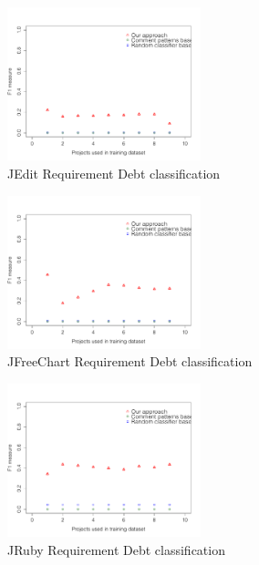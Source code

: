 \begin{figure}[thb!]
  \centering
  \includegraphics[width=0.50\textwidth]{figures/appendix/iteration_details/implementation_jedit.pdf}
  \vspace{-3mm}
  \caption{JEdit Requirement Debt classification}
  \label{fig:implementation_jedit}
\end{figure}

\begin{figure}[thb!]
  \centering
  \includegraphics[width=0.50\textwidth]{figures/appendix/iteration_details/implementation_jfreechart.pdf}
  \vspace{-3mm}
  \caption{JFreeChart Requirement Debt classification}
  \label{fig:implementation_jfreechart}
\end{figure}

\begin{figure}[thb!]
  \centering
  \includegraphics[width=0.50\textwidth]{figures/appendix/iteration_details/implementation_jruby.pdf}
  \vspace{-3mm}
  \caption{JRuby Requirement Debt classification}
  \label{fig:implementation_jruby}
\end{figure}

